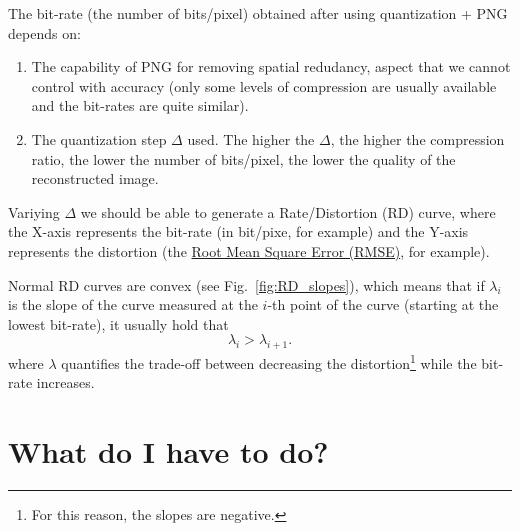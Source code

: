The bit-rate (the number of bits/pixel) obtained after using
quantization + PNG depends on:
\begin{enumerate}
\item The capability of PNG for removing spatial redudancy, aspect
  that we cannot control with accuracy (only some levels of
  compression are usually available and the bit-rates are quite
  similar).
\item The quantization step $\Delta$ used. The higher the $\Delta$,
  the higher the compression ratio, the lower the number of
  bits/pixel, the lower the quality of the reconstructed image.
\end{enumerate}
Variying $\Delta$ we should be able to generate a Rate/Distortion (RD)
curve, where the X-axis represents the bit-rate (in bit/pixe, for
example) and the Y-axis represents the distortion (the
\href{https://en.wikipedia.org/wiki/Root-mean-square_deviation}{Root
  Mean Square Error (RMSE)}, for example).

Normal RD curves are convex (see Fig.~\ref{fig:RD_slopes}), which
means that if $\lambda_i$ is the slope of the curve measured at the
$i$-th point of the curve (starting at the lowest bit-rate), it
usually hold that
\begin{equation}
  \lambda_i > \lambda_{i+1}.
\end{equation}
where $\lambda$ quantifies the trade-off between decreasing the
distortion\footnote{For this reason, the slopes are negative.} while
the bit-rate
increases.~\cite{vetterli1995wavelets,sayood2017introduction}



\section{What do I have to do?}

